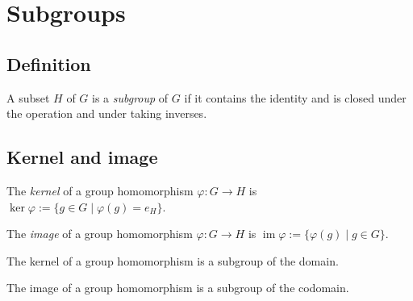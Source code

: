 \section{Subgroups}
\label{sec:groups:subgroups}

\subsection{Definition}
\label{subsec:groups:subgroups-definition}

\begin{definition}
  \label{def:groups:is-subgroup}
  \leanok
  A subset $H$ of $G$ is a \emph{subgroup} of $G$ if it contains the
  identity and is closed under the operation and under taking
  inverses.
\end{definition}

\subsection{Kernel and image}
\label{subsec:groups:kernel-and-image}

\begin{definition}
  \label{def:groups:kernel}
  \leanok
  The \emph{kernel} of a group homomorphism $\varphi : G \to H$ is
  $\ker\varphi := \{g \in G \mid \varphi(g) = e_H\}$.
\end{definition}

\begin{definition}
  \label{def:groups:image}
  \leanok
  The \emph{image} of a group homomorphism $\varphi : G \to H$ is
  $\operatorname{im}\varphi := \{\varphi(g) \mid g \in G\}$.
\end{definition}

\begin{proposition}
  \label{prop:groups:kernel-is-subgroup}
  The kernel of a group homomorphism is a subgroup of the domain.
\end{proposition}

\begin{proposition}
  \label{prop:groups:image-is-subgroup}
  The image of a group homomorphism is a subgroup of the codomain.
\end{proposition}

